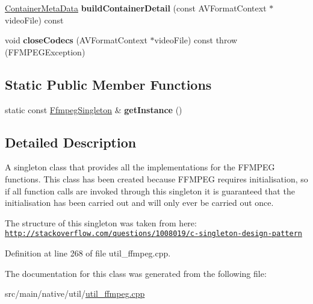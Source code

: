 \begin{DoxyCompactItemize}
\item 
\hypertarget{classtranscode_1_1util_1_1FfmpegSingleton_a41251296d417f2751754b5d7f7f6205a}{
\hyperlink{structtranscode_1_1ContainerMetaData}{ContainerMetaData} {\bfseries buildContainerDetail} (const AVFormatContext $\ast$videoFile) const }
\label{classtranscode_1_1util_1_1FfmpegSingleton_a41251296d417f2751754b5d7f7f6205a}

\item 
\hypertarget{classtranscode_1_1util_1_1FfmpegSingleton_a9e30a10b3a4b443dfec543da746bab6e}{
void {\bfseries closeCodecs} (AVFormatContext $\ast$videoFile) const   throw (FFMPEGException)}
\label{classtranscode_1_1util_1_1FfmpegSingleton_a9e30a10b3a4b443dfec543da746bab6e}

\end{DoxyCompactItemize}
\subsection*{Static Public Member Functions}
\begin{DoxyCompactItemize}
\item 
\hypertarget{classtranscode_1_1util_1_1FfmpegSingleton_a37162eb4957bbfec135c6e24857363eb}{
static const \hyperlink{classtranscode_1_1util_1_1FfmpegSingleton}{FfmpegSingleton} \& {\bfseries getInstance} ()}
\label{classtranscode_1_1util_1_1FfmpegSingleton_a37162eb4957bbfec135c6e24857363eb}

\end{DoxyCompactItemize}


\subsection{Detailed Description}
A singleton class that provides all the implementations for the FFMPEG functions. This class has been created because FFMPEG requires initialisation, so if all function calls are invoked through this singleton it is guaranteed that the initialisation has been carried out and will only ever be carried out once.

The structure of this singleton was taken from here: \href{http://stackoverflow.com/questions/1008019/c-singleton-design-pattern}{\tt http://stackoverflow.com/questions/1008019/c-\/singleton-\/design-\/pattern} 

Definition at line 268 of file util\_\-ffmpeg.cpp.



The documentation for this class was generated from the following file:\begin{DoxyCompactItemize}
\item 
src/main/native/util/\hyperlink{util__ffmpeg_8cpp}{util\_\-ffmpeg.cpp}\end{DoxyCompactItemize}
